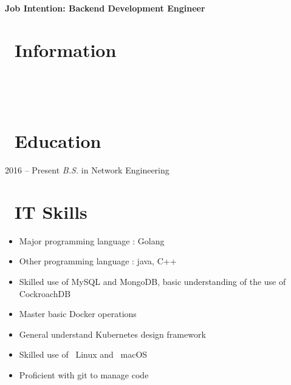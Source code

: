 \documentclass{resume}
\begin{document}

  \hfill \vspace{2mm} \par
\textbf{Job Intention: Backend Development Engineer}

\section{\faUserSecret\ Information} \vspace{1mm}

{\phone\  \qquad\qquad\quad
\email\ 
\vspace{2mm} \par
\github\  \qquad
\faLink\ }

\section{\faGraduationCap\ Education} \vspace{1mm}

{2016 -- Present}
\vspace{1mm}
\textit{B.S.} in Network Engineering

\section{\faCogs\ IT Skills} \vspace{1mm}

\begin{itemize}[parsep=1ex]
  \item Major programming language : Golang
  \item Other programming language : java, C++
  \item Skilled use of MySQL and MongoDB, basic understanding of the use of CockroachDB
  \item Master basic Docker operations
  \item General understand Kubernetes design framework
  \item Skilled use of \faLinux\ {Linux} and \faApple\ {macOS}
  \item Proficient with git to manage code
\end{itemize}
\end{document}
